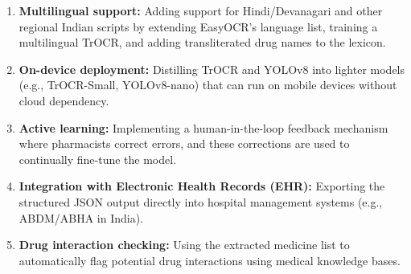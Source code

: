 \documentclass[12pt,a4paper,oneside]{report}
\begin{document}
\begin{enumerate}
  \item \textbf{Multilingual support:} Adding support for Hindi/Devanagari and other regional Indian scripts by extending EasyOCR's language list, training a multilingual TrOCR, and adding transliterated drug names to the lexicon.

  \item \textbf{On-device deployment:} Distilling TrOCR and YOLOv8 into lighter models (e.g., TrOCR-Small, YOLOv8-nano) that can run on mobile devices without cloud dependency.

  \item \textbf{Active learning:} Implementing a human-in-the-loop feedback mechanism where pharmacists correct errors, and these corrections are used to continually fine-tune the model.

  \item \textbf{Integration with Electronic Health Records (EHR):} Exporting the structured JSON output directly into hospital management systems (e.g., ABDM/ABHA in India).

  \item \textbf{Drug interaction checking:} Using the extracted medicine list to automatically flag potential drug interactions using medical knowledge bases.
\end{enumerate}
\end{document}
